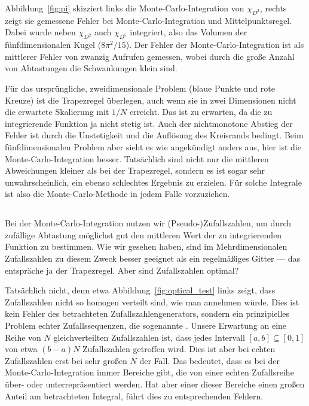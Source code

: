 Abbildung~\ref{fig:pi} skizziert links die Monte-Carlo-Integration von
$\chi_{D^2}$, rechts zeigt sie gemessene Fehler bei
Monte-Carlo-Integration und Mittelpunktsregel. Dabei wurde neben
$\chi_{D^2}$ auch $\chi_{D^5}$ integriert, also das Volumen der
fünfdimensionalen Kugel ($8\pi^2/15$). Der Fehler der
Monte-Carlo-Integration ist als mittlerer Fehler von zwanzig Aufrufen
gemessen, wobei durch die große Anzahl von Abtastungen die
Schwankungen klein sind.

Für das ursprüngliche, zweidimensionale Problem (blaue Punkte und rote
Kreuze) ist die Trapezregel überlegen, auch wenn sie in zwei
Dimensionen nicht die erwartete Skalierung mit $1/N$ erreicht. Das ist
zu erwarten, da die zu integrierende Funktion ja nicht stetig
ist. Auch der nichtmonotone Abstieg der Fehler ist durch die
Unstetigkeit und die Auflösung des Kreisrands bedingt. Beim
fünfdimensionalen Problem aber sieht es wie angekündigt anders aus,
hier ist die Monte-Carlo-Integration besser. Tatsächlich sind nicht
nur die mittleren Abweichungen kleiner als bei der Trapezregel,
sondern es ist sogar sehr unwahrscheinlich, ein ebenso schlechtes
Ergebnis zu erzielen. Für solche Integrale ist also die
Monte-Carlo-Methode in jedem Falle vorzuziehen.

\subsection{}

Bei der Monte-Carlo-Integration nutzen wir (Pseudo-)Zufallszahlen, um
durch zufällige Abtastung möglichst gut den mittleren Wert der zu
integrierenden Funktion zu bestimmen. Wie wir gesehen haben, sind im
Mehrdimensionalen Zufallszahlen zu diesem Zweck besser geeignet als
ein regelmäßiges Gitter --- das entspräche ja der
Trapezregel. Aber sind Zufallszahlen optimal?

Tatsächlich nicht, denn etwa Abbildung~\ref{fig:optical_test} links
zeigt, dass Zufallszahlen nicht so homogen verteilt sind, wie man
annehmen würde. Dies ist kein Fehler des betrachteten
Zufallszahlengenerators, sondern ein prinzipielles Problem echter
Zufallssequenzen, die sogenannte \emph{}. Unsere
Erwartung an eine Reihe von $N$ gleichverteilten Zufallszahlen ist,
dass jedes Intervall $[a,b]\subseteq [0,1]$ von etwa $(b-a)N$
Zufallszahlen getroffen wird. Dies ist aber bei echten Zufallszahlen
erst bei sehr großen $N$ der Fall. Das bedeutet, dass es bei der
Monte-Carlo-Integration immer Bereiche gibt, die von einer echten
Zufallsreihe über- oder unterrepräsentiert werden. Hat aber einer
dieser Bereiche einen großen Anteil am betrachteten Integral, führt
dies zu entsprechenden Fehlern.

